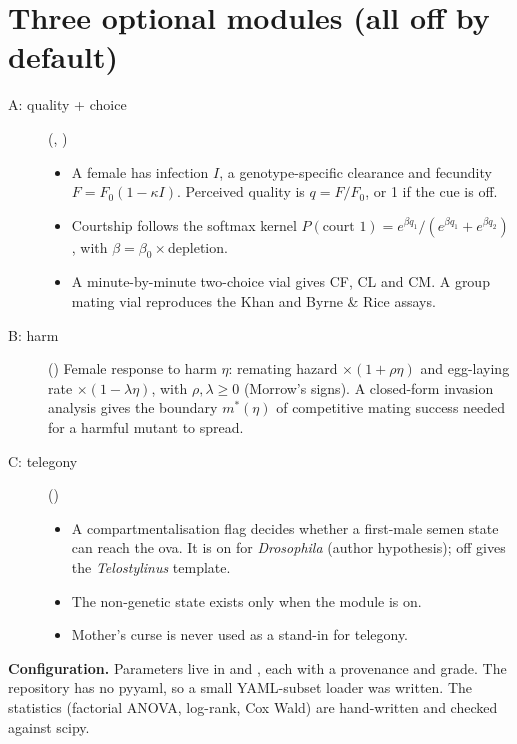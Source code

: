 \section{Three optional modules (all off by default)}
\begin{description}
\item[A: quality + choice] (, )
  \begin{itemize}
  \item A female has infection $I$, a genotype-specific clearance and fecundity $F=F_0(1-\kappa I)$. Perceived quality is $q=F/F_0$, or 1 if the cue is off.
  \item Courtship follows the softmax kernel $P(\text{court }1)=e^{\beta q_1}/(e^{\beta q_1}+e^{\beta q_2})$, with $\beta=\beta_0\times$depletion.
  \item A minute-by-minute two-choice vial gives CF, CL and CM. A group mating vial reproduces the Khan and Byrne \& Rice assays.
  \end{itemize}
\item[B: harm] () Female response to harm $\eta$: remating hazard $\times(1+\rho\eta)$ and egg-laying rate $\times(1-\lambda\eta)$, with $\rho,\lambda\ge0$ (Morrow's signs). A closed-form invasion analysis gives the boundary $m^*(\eta)$ of competitive mating success needed for a harmful mutant to spread.
\item[C: telegony] ()
  \begin{itemize}
  \item A compartmentalisation flag decides whether a first-male semen state can reach the ova. It is on for \emph{Drosophila} (author hypothesis); off gives the \emph{Telostylinus} template.
  \item The non-genetic state exists only when the module is on.
  \item Mother's curse is never used as a stand-in for telegony.
  \end{itemize}
\end{description}

\textbf{Configuration.} Parameters live in  and , each with a provenance and grade. The repository has no pyyaml, so a small YAML-subset loader was written. The statistics (factorial ANOVA, log-rank, Cox Wald) are hand-written and checked against scipy.

